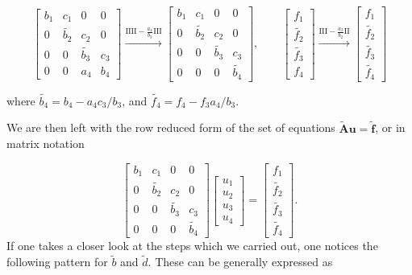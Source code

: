 \documentclass[a4paper,10pt]{article}
\begin{document}
\[
\begin{bmatrix}
b_1 & c_1 & 0 & 0 \\
0& \tilde{b_2}  & c_2 & 0 \\
0 & 0 & \tilde{b_3} & c_3 \\
0 & 0 & a_4 & b_4 
\end{bmatrix}
\xrightarrow{\text{IIII} - \frac{a_4}{b_3}\text{III}}
\begin{bmatrix}
b_1 & c_1 & 0 & 0 \\
0& \tilde{b_2}  & c_2 & 0 \\
0 & 0 & \tilde{b_3} & c_3 \\
0 & 0 & 0 & \tilde{b_4} 
\end{bmatrix}, \qquad
\begin{bmatrix}
f_1\\
\tilde{f_2}\\
\tilde{f_3}\\
f_4
\end{bmatrix}
\xrightarrow{\text{III} - \frac{a_3}{b_2}\text{II}}
\begin{bmatrix}
f_1\\
\tilde{f_2}\\
\tilde{f_3}\\
\tilde{f_4}
\end{bmatrix}
\]

where $\tilde{b_4} = b_4 - a_4c_3/b_3$, and $\tilde{f_4} = f_4 - f_3a_4/b_3$. 

\newpage

We are then left with the row reduced form of the set of equations $\tilde{\mathbf{A}}\mathbf{u} = \tilde{\mathbf{f}}$, or in matrix notation

\begin{equation}
\begin{bmatrix}
b_1 & c_1 & 0 & 0 \\
0& \tilde{b_2}  & c_2 & 0 \\
0 & 0 & \tilde{b_3} & c_3 \\
0 & 0 & 0 & \tilde{b_4} 
\end{bmatrix} \begin{bmatrix}
u_1\\
u_2\\
u_3\\
u_4
\end{bmatrix} = \begin{bmatrix}
f_1\\
\tilde{f_2}\\
\tilde{f_3}\\
\tilde{f_4}
\end{bmatrix}.
\end{equation}
If one takes a closer look at the steps which we carried out, one notices the following pattern for $\tilde{b}$ and $\tilde{d}$. These can be generally expressed as
\end{document}
